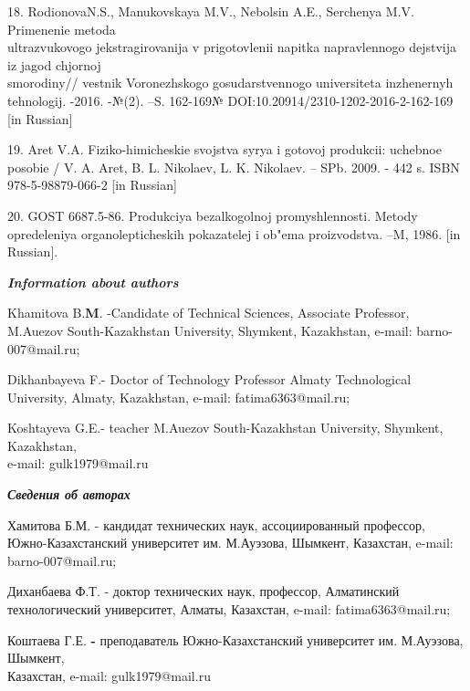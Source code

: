 \begin{noparindent}
18. RodionovaN.S., Manukovskaya M.V., Nebol\textquotesingle sin A.E.,
Serchenya M.V. Primenenie metoda \\ul\textquotesingle trazvukovogo
jekstragirovanija v prigotovlenii napitka napravlennogo dejstvija iz
jagod chjornoj \\smorodiny// vestnik Voronezhskogo gosudarstvennogo
universiteta inzhenernyh tehnologij. -2016. -№(2). --S. 162-169№
DOI:10.20914/2310-1202-2016-2-162-169 {[}in Russian{]}

19. Aret V.A. Fiziko-himicheskie svojstva syr\textquotesingle ya i
gotovoj produkcii: uchebnoe posobie / V. A. Aret, B. L. Nikolaev, L. K.
Nikolaev. -- SPb. 2009. - 442 s. ISBN 978-5-98879-066-2 {[}in Russian{]}

20. GOST 6687.5-86. Produkciya bezalkogol\textquotesingle noj
promyshlennosti. Metody opredeleniya organolepticheskih pokazatelej i
ob"ema proizvodstva. --M, 1986. {[}in Russian{]}.

\end{noparindent}

\emph{{\bfseries Information about authors}}

\begin{noparindent}

Khamitova B.{\bfseries M}. -Candidate of Technical Sciences, Associate
Professor, M.Auezov South-Kazakhstan University, Shymkent, Kazakhstan,
e-mail: barno-007@mail.ru;

Dikhanbayeva F.- Doctor of Technology Professor Almaty Technological
University, Almaty, Kazakhstan, e-mail: fatima6363@mail.ru;

Koshtayeva G.E.- teacher M.Auezov South-Kazakhstan University, Shymkent,
Kazakhstan, \\e-mail: gulk1979@mail.ru

\end{noparindent}

\emph{{\bfseries Сведения об авторах}}

\begin{noparindent}

Хамитова Б.М. - кандидат технических наук, ассоциированный профессор,
Южно-Казахстанский университет им. М.Ауэзова, Шымкент, Казахстан,
e-mail: barno-007@mail.ru;

Диханбаева Ф.Т. - доктор технических наук, профессор, Алматинский
технологический университет, Алматы, Казахстан, e-mail:
fatima6363@mail.ru;

Коштаева Г.Е. {\bfseries -} преподаватель Южно-Казахстанский университет
им. М.Ауэзова, Шымкент,\\ Казахстан, e-mail: gulk1979@mail.ru
\end{noparindent}
